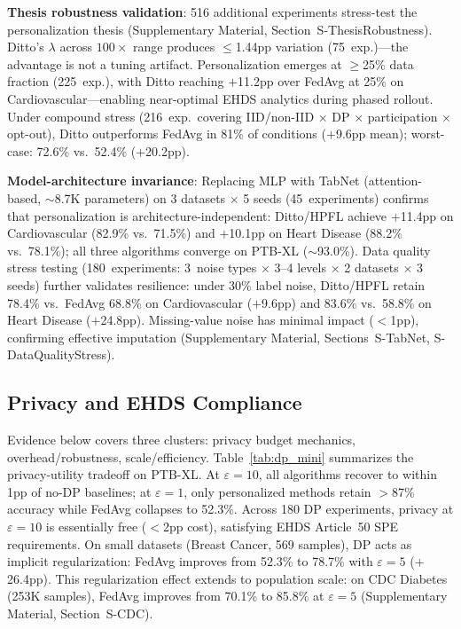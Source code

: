 \documentclass[conference]{IEEEtran}
\begin{document}
\textbf{Thesis robustness validation}: 516 additional experiments stress-test the personalization thesis (Supplementary Material, Section~S-ThesisRobustness). Ditto's $\lambda$ across $100\times$ range produces $\leq$1.44pp variation (75~exp.)---the advantage is not a tuning artifact. Personalization emerges at $\geq$25\% data fraction (225~exp.), with Ditto reaching $+$11.2pp over FedAvg at 25\% on Cardiovascular---enabling near-optimal EHDS analytics during phased rollout. Under compound stress (216~exp.\ covering IID/non-IID $\times$ DP $\times$ participation $\times$ opt-out), Ditto outperforms FedAvg in 81\% of conditions ($+$9.6pp mean); worst-case: 72.6\% vs.\ 52.4\% ($+$20.2pp).

\textbf{Model-architecture invariance}: Replacing MLP with TabNet (attention-based, $\sim$8.7K parameters) on 3 datasets $\times$ 5 seeds (45~experiments) confirms that personalization is architecture-independent: Ditto/HPFL achieve $+$11.4pp on Cardiovascular (82.9\% vs.\ 71.5\%) and $+$10.1pp on Heart Disease (88.2\% vs.\ 78.1\%); all three algorithms converge on PTB-XL ($\sim$93.0\%). Data quality stress testing (180~experiments: 3~noise types $\times$ 3--4 levels $\times$ 2 datasets $\times$ 3 seeds) further validates resilience: under 30\% label noise, Ditto/HPFL retain 78.4\% vs.\ FedAvg 68.8\% on Cardiovascular ($+$9.6pp) and 83.6\% vs.\ 58.8\% on Heart Disease ($+$24.8pp). Missing-value noise has minimal impact ($<$1pp), confirming effective imputation (Supplementary Material, Sections~S-TabNet, S-DataQualityStress).

\subsection{Privacy and EHDS Compliance}

Evidence below covers three clusters: privacy budget mechanics, overhead/robustness, scale/efficiency. Table~\ref{tab:dp_mini} summarizes the privacy-utility tradeoff on PTB-XL. At $\varepsilon{=}10$, all algorithms recover to within 1pp of no-DP baselines; at $\varepsilon{=}1$, only personalized methods retain $>$87\% accuracy while FedAvg collapses to 52.3\%. Across 180 DP experiments, privacy at $\varepsilon{=}10$ is essentially free ($<$2pp cost), satisfying EHDS Article~50 SPE requirements. On small datasets (Breast Cancer, 569 samples), DP acts as implicit regularization: FedAvg improves from 52.3\% to 78.7\% with $\varepsilon{=}5$ ($+$26.4pp). This regularization effect extends to population scale: on CDC Diabetes (253K samples), FedAvg improves from 70.1\% to 85.8\% at $\varepsilon{=}5$ (Supplementary Material, Section~S-CDC).
\end{document}

